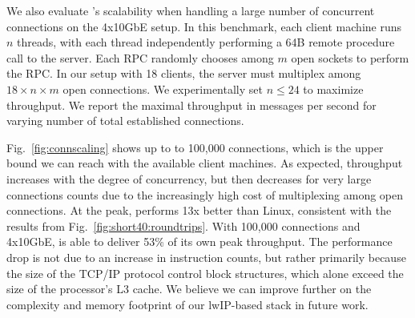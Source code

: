 \label{sec:eval:scale}

We also evaluate \ix's scalability when handling a large number of
concurrent connections on the 4x10GbE setup. In this benchmark, each client machine runs
$n$ threads, with each thread independently performing a 64B remote
procedure call to the server.  Each RPC randomly chooses among $m$
open sockets to perform the RPC.  In our setup with 18 clients, the
server must multiplex among $18 \times n \times m$ open connections.
We experimentally set $n \leq 24$ to maximize throughput.  We report
the maximal throughput in messages per second for varying number of
total established connections.



Fig.~\ref{fig:connscaling} shows up to to 100,000 connections, which
is the upper bound we can reach with the available client machines.
As expected, throughput increases with the degree of concurrency, but
then decreases for very large connections counts due to the
increasingly high cost of multiplexing among open connections.  At the
peak, \ix performs 13x better than Linux, consistent with the results
from Fig.~\ref{fig:short40:roundtrips}.  With 100,000 connections and
4x10GbE, \ix is able to deliver 53\% of its own peak throughput.  The
performance drop is not due to an increase in instruction counts, but
rather primarily because the size of the TCP/IP protocol control block
structures, which alone exceed the size of the processor's L3
cache. We believe we can improve further on the complexity and memory
footprint of our lwIP-based stack in future work. 


